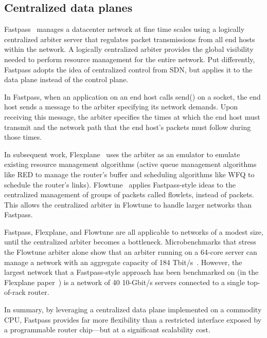 \subsection{Centralized data planes}
Fastpass~\cite{fastpass} manages a datacenter network at fine time scales using
a logically centralized arbiter server that regulates packet transmissions from all
end hosts within the network. A logically centralized arbiter provides the
global visibility needed to perform resource management for the entire network.
Put differently, Fastpass adopts the idea of centralized control from SDN, but
applies it to the data plane instead of the control plane.

In Fastpass, when an application on an end host calls send() on a socket, the
end host sends a message to the arbiter specifying its network demands. Upon
receiving this message, the arbiter specifies the times at which the end host
must transmit and the network path that the end host's packets must follow
during those times. 

In subsequent work, Flexplane~\cite{flexplane} uses the arbiter as an emulator
to emulate existing resource management algorithms (\eg active queue management
algorithms like RED to manage the router's buffer and scheduling algorithms
like WFQ to schedule the router's links).  Flowtune~\cite{flowtune} applies
Fastpass-style ideas to the centralized management of groups of packets called
flowlets, instead of packets.  This allows the centralized arbiter in Flowtune
to handle larger networks than Fastpass.

Fastpass, Flexplane, and Flowtune are all applicable to networks of a modest
size, until the centralized arbiter becomes a bottleneck.  Microbenchmarks that
stress the Flowtune arbiter alone show that an arbiter running on a 64-core
server can manage a network with an aggregate capacity of 184
Tbit/s~\cite{flowtune}. However, the largest network that a Fastpass-style
approach has been benchmarked on (in the Flexplane paper~\cite{flexplane}) is a
network of 40 10-Gbit/s servers connected to a single top-of-rack router.

In summary, by leveraging a centralized data plane implemented on a commodity
CPU, Fastpass provides far more flexibility than a restricted interface exposed
by a programmable router chip---but at a significant scalability cost.

